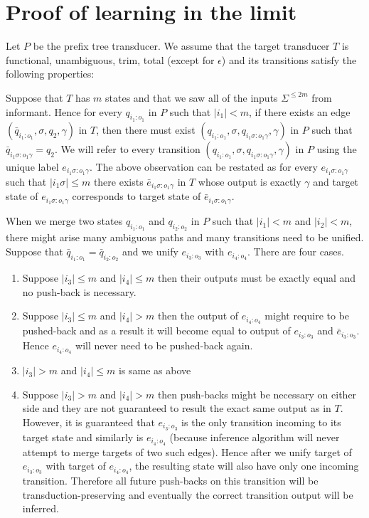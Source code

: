 \section{Proof of learning in the limit}


Let $P$ be the prefix tree transducer. We assume that the target transducer $T$ is functional, unambiguous, trim, total (except for $\epsilon$) and its transitions satisfy the following properties: 


Suppose that $T$ has $m$ states and that we saw all of the inputs $\Sigma^{\le 2m}$ from informant. Hence for every $q_{i_1:o_1}$ in $P$ such that $\vert i_1\vert < m$,  if there exists an edge $(\bar{q}_{i_1:o_1},\sigma,q_2,\gamma)$ in $T$, then there must exist $(q_{i_1:o_1},\sigma,q_{i_1\sigma:o_1\gamma},\gamma)$ in $P$ such that $\bar{q}_{i_1\sigma:o_1\gamma}=q_2$. We will refer to every transition  $(q_{i_1:o_1},\sigma,q_{i_1\sigma:o_1\gamma},\gamma)$ in $P$ using the unique label $e_{i_1\sigma:o_1\gamma}$. The above observation can be restated as for every $e_{i_1\sigma:o_1\gamma}$ such that $\vert i_1\sigma\vert \le m$ there exists $\bar{e}_{i_1\sigma:o_1\gamma}$ in $T$ whose output is exactly $\gamma$ and target state of $e_{i_1\sigma:o_1\gamma}$ corresponds to target state of $\bar{e}_{i_1\sigma:o_1\gamma}$.


When we merge two states $q_{i_1:o_1}$ and $q_{i_2:o_2}$ in $P$ such that $\vert i_1 \vert < m$ and $\vert i_2 \vert < m$, there might arise many ambiguous paths and many transitions need to be unified. Suppose that $\bar{q}_{i_1:o_1}=\bar{q}_{i_2:o_2}$ and we unify $e_{i_3:o_3}$ with $e_{i_4:o_4}$. There are four cases. 
\begin{enumerate}
	\item Suppose $\vert i_3 \vert \le m $ and  $\vert i_4 \vert \le m $ then their outputs must be exactly equal and no push-back is necessary.
	\item Suppose $\vert i_3 \vert \le m $ and  $\vert i_4 \vert > m $ then the output of $e_{i_4:o_4}$ might require to be pushed-back and as a result it will become equal to output of $e_{i_3:o_3}$ and $\bar{e}_{i_3:o_3}$. Hence $e_{i_4:o_4}$ will never need to be pushed-back again.
	\item  $\vert i_3 \vert > m $ and  $\vert i_4 \vert \le  m $ is same as above
	\item Suppose $\vert i_3 \vert > m $ and  $\vert i_4 \vert > m $ then push-backs might be necessary on either side and they are not guaranteed to result the exact same output as in $T$. However, it is guaranteed that $e_{i_3:o_3}$ is the only transition incoming to its target state and similarly is $e_{i_4:o_4}$ (because inference algorithm will never attempt to merge targets of two such edges). Hence after we unify target of $e_{i_3:o_3}$ with target of $e_{i_4:o_4}$, the resulting state will also have only one incoming transition. Therefore all future push-backs on this transition will be transduction-preserving and eventually the correct transition output will be inferred. 
\end{enumerate}

